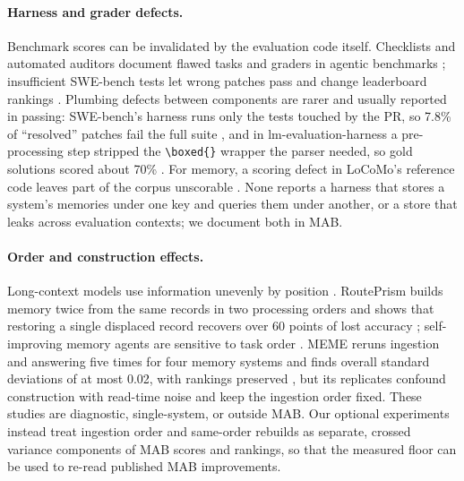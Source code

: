 \paragraph{Harness and grader defects.}
Benchmark scores can be invalidated by the evaluation code itself. Checklists and automated auditors document flawed tasks and graders in agentic benchmarks \citep{zhu2025abc,tu2026benchguard}; insufficient SWE-bench tests let wrong patches pass and change leaderboard rankings \citep{yu2025utboost}. Plumbing defects between components are rarer and usually reported in passing: SWE-bench's harness runs only the tests touched by the PR, so 7.8\% of ``resolved'' patches fail the full suite \citep{wang2025solved}, and in lm-evaluation-harness a pre-processing step stripped the \texttt{\textbackslash boxed\{\}} wrapper the parser needed, so gold solutions scored about 70\% \citep{schaeffer2026contamination}. For memory, a scoring defect in LoCoMo's reference code leaves part of the corpus unscorable \citep{tanguturi2026atant}. None reports a harness that stores a system's memories under one key and queries them under another, or a store that leaks across evaluation contexts; we document both in MAB.

\paragraph{Order and construction effects.}
Long-context models use information unevenly by position \citep{liu2024lost}. RoutePrism builds memory twice from the same records in two processing orders and shows that restoring a single displaced record recovers over 60 points of lost accuracy \citep{xu2026routeprism}; self-improving memory agents are sensitive to task order \citep{ye2026fragility}. MEME reruns ingestion and answering five times for four memory systems and finds overall standard deviations of at most 0.02, with rankings preserved \citep{jung2026meme}, but its replicates confound construction with read-time noise and keep the ingestion order fixed. These studies are diagnostic, single-system, or outside MAB. Our optional experiments instead treat ingestion order and same-order rebuilds as separate, crossed variance components of MAB scores and rankings, so that the measured floor can be used to re-read published MAB improvements.
